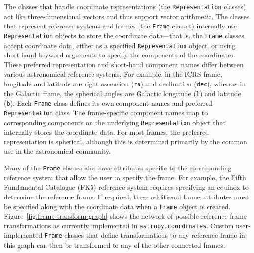 \documentclass[modern]{aastex61}
\renewcommand{\figurename}{Figure\xspace}
\begin{document}
The classes that handle coordinate representations (the \texttt{Representation}
classes) act like three-dimensional vectors and thus support vector arithmetic.
The classes that represent reference systems and frames (the \texttt{Frame}
classes) internally use \texttt{Representation} objects to store the coordinate
data---that is, the \texttt{Frame} classes accept coordinate data, either as a
specified \texttt{Representation} object, or using short-hand keyword arguments
to specify the components of the coordinates.
These preferred representation and short-hand component names differ between
various astronomical reference systems.
For example, in the ICRS frame, longitude and latitude are right ascension
(\texttt{ra}) and declination (\texttt{dec}), whereas in the Galactic frame, the
spherical angles are Galactic longitude (\texttt{l}) and latitude (\texttt{b}).
Each \texttt{Frame} class defines its own component names and preferred \texttt{Representation} class.
The frame-specific component names map to corresponding components on the
underlying \texttt{Representation} object that internally stores the coordinate
data.
For most frames, the preferred representation is spherical, although this is
determined primarily by the common use in the astronomical community.

Many of the \texttt{Frame} classes also have attributes specific to the
corresponding reference system that allow the user to specify the frame.
For example, the Fifth Fundamental Catalogue (FK5) reference system requires
specifying an equinox to determine the reference frame.
If required, these additional frame attributes must be specified along with the
coordinate data when a \texttt{Frame} object is created.
\figurename~\ref{fig:frame-transform-graph} shows the network of possible
reference frame transformations as currently implemented in
\texttt{astropy.coordinates}.
Custom user-implemented \texttt{Frame} classes that define transformations to
any reference frame in this graph can then be transformed to any of the other
connected frames.
\end{document}
